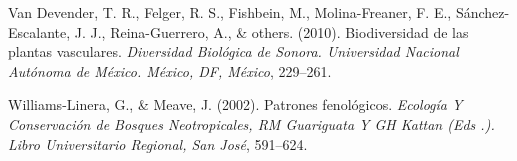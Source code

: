 \documentclass[11pt,]{article}
\begin{document}
\hypertarget{ref-van2010biodiversidad}{}
Van Devender, T. R., Felger, R. S., Fishbein, M., Molina-Freaner, F. E.,
Sánchez-Escalante, J. J., Reina-Guerrero, A., \& others. (2010).
Biodiversidad de las plantas vasculares. \emph{Diversidad Biológica de
Sonora. Universidad Nacional Autónoma de México. México, DF, México},
229--261.

\hypertarget{ref-williams2002patrones}{}
Williams-Linera, G., \& Meave, J. (2002). Patrones fenológicos.
\emph{Ecología Y Conservación de Bosques Neotropicales, RM Guariguata Y
GH Kattan (Eds .). Libro Universitario Regional, San José}, 591--624.




\newpage
\singlespacing 
\end{document}
